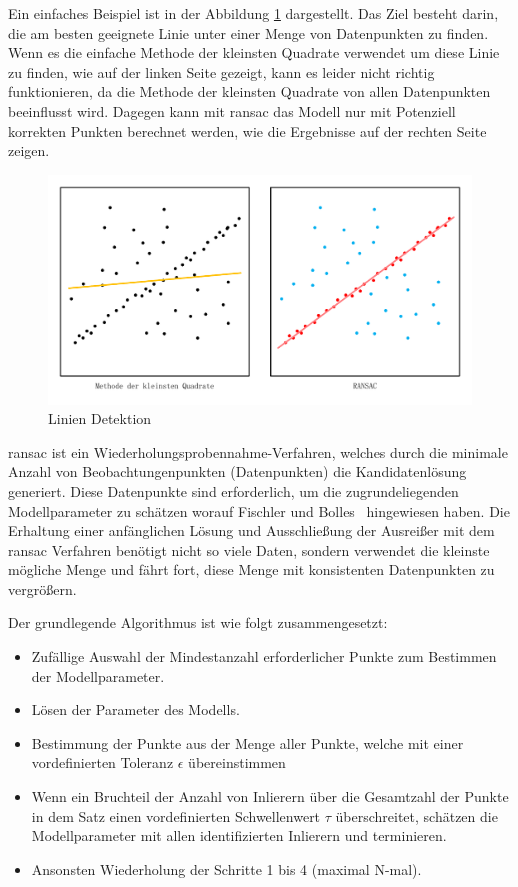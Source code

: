 Ein einfaches Beispiel ist in der Abbildung \ref{fig:Linien Detektion} dargestellt. Das Ziel besteht darin, die am besten geeignete Linie unter einer Menge von Datenpunkten zu finden. Wenn es die einfache Methode der kleinsten Quadrate verwendet um diese Linie zu finden, wie auf der linken Seite gezeigt, kann es leider nicht richtig funktionieren, da die Methode der kleinsten Quadrate von allen Datenpunkten beeinflusst wird. Dagegen kann mit \gls{ransac} das Modell nur mit Potenziell korrekten Punkten berechnet werden, wie die Ergebnisse auf der rechten Seite zeigen. 

\begin{figure}[H]
 \centering 
 \includegraphics[keepaspectratio,width=1.0\textwidth]{images/3_Ersteverfahren/RANSAC/Linien_Detektion.pdf}
 \caption{Linien Detektion}
 \label{fig:Linien Detektion}
\end{figure} 

\gls{ransac} ist ein Wiederholungsprobennahme-Verfahren, welches durch die minimale Anzahl von Beobachtungenpunkten (Datenpunkten) die Kandidatenlösung generiert. Diese Datenpunkte sind erforderlich, um die zugrundeliegenden Modellparameter zu schätzen worauf Fischler und Bolles~\cite{ransac1} hingewiesen haben. Die Erhaltung einer anfänglichen Lösung und Ausschließung der Ausreißer mit dem \gls{ransac} Verfahren benötigt nicht so viele Daten, sondern verwendet die kleinste mögliche Menge und fährt fort, diese Menge mit konsistenten Datenpunkten zu vergrößern.

Der grundlegende Algorithmus ist wie folgt zusammengesetzt:

\begin{itemize}
	\item Zufällige Auswahl der Mindestanzahl erforderlicher Punkte zum Bestimmen der Modellparameter.
	\item Lösen der Parameter des Modells.
	\item Bestimmung der Punkte aus der Menge aller Punkte, welche mit einer vordefinierten Toleranz $\epsilon$ übereinstimmen
	\item Wenn ein Bruchteil der Anzahl von Inlierern über die Gesamtzahl der Punkte in dem Satz einen vordefinierten Schwellenwert $\tau$ überschreitet, schätzen die Modellparameter mit allen identifizierten Inlierern und terminieren.
	\item Ansonsten Wiederholung der Schritte 1 bis 4 (maximal N-mal).
\end{itemize}

